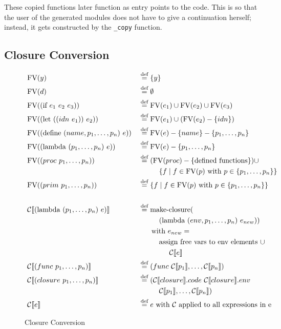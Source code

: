 \documentclass[11pt]{report}
\newcommand{\eqdef}{\stackrel{\text{def}}{=}}%
\begin{document}
These copied functions later function as entry points to the code. This is so that the user of the generated modules does not have to give a continuation herself; instead, it gets constructed by the \texttt{_copy} function.

\subsection{Closure Conversion}
\begin{figure}[p]
\begin{alignat*}{2}
&\text{FV}(y) &&\eqdef \{y\}\\
&\text{FV}(d) &&\eqdef \emptyset\\
&\text{FV}((\text{if}\ e_1\ e_2\ e_3)) &&\eqdef \text{FV}(e_1) \cup \text{FV}(e_2) \cup \text{FV}(e_3)\\
&\text{FV}((\text{let}\ ((idn\ e_1))\ e_2)) &&\eqdef \text{FV}(e_1) \cup (\text{FV}(e_2) - \{idn\})\\
&\text{FV}((\text{define}\ (name, p_1, \dots, p_n)\ e)) &&\eqdef \text{FV}(e) - \{name\} - \{p_1, \dots, p_n\}\\
&\text{FV}((\text{lambda}\ (p_1, \dots, p_n)\ e)) &&\eqdef \text{FV}(e) - \{p_1, \dots, p_n\}\\
&\text{FV}((proc\ p_1, \dots, p_n)) &&\eqdef (\text{FV}(proc) - \{\text{defined functions}\}) \cup \\
&&&\hspace{1cm}\{f \mid f \in \text{FV}(p)\ \text{with}\ p \in \{p_1, \dots, p_n\}\}\\
&\text{FV}((prim\ p_1, \dots, p_n)) &&\eqdef \{f \mid f \in \text{FV}(p)\ \text{with}\ p \in \{p_1, \dots, p_n\}\}\\
%
&&&\\
%
&\mathcal{C}\llbracket (\text{lambda}\ (p_1, \dots, p_n)\ e) \rrbracket &&\eqdef \text{make-closure}(\\
&&&\hspace{1cm}(\text{lambda}\ (env, p_1, \dots, p_n)\ e_{new}))\\
&&&\hspace{0.625cm}\text{with}\ e_{new} = \\
&&&\hspace{1cm}\text{assign free vars to env elements}\ \cup \\
&&&\hspace{1.5cm}\mathcal{C}\llbracket e \rrbracket\\
%
&\mathcal{C}\llbracket (func\ p_1, \dots, p_n) \rrbracket &&\eqdef (func\  \mathcal{C}\llbracket p_1 \rrbracket, \dots, \mathcal{C}\llbracket p_n \rrbracket)\\
&\mathcal{C}\llbracket (closure\ p_1, \dots, p_n) \rrbracket &&\eqdef (\mathcal{C}\llbracket closure\rrbracket.code\ \mathcal{C}\llbracket closure\rrbracket.env\\\
&&&\hspace{1cm}\mathcal{C}\llbracket p_1\rrbracket, \dots, \mathcal{C}\llbracket p_n\rrbracket)\\
&\mathcal{C}\llbracket e \rrbracket && \eqdef e\text{ with $\mathcal{C}$ applied to all expressions in e}\\
\end{alignat*}
\caption{Closure Conversion}
\label{cloconv}
\end{figure}
\end{document}
